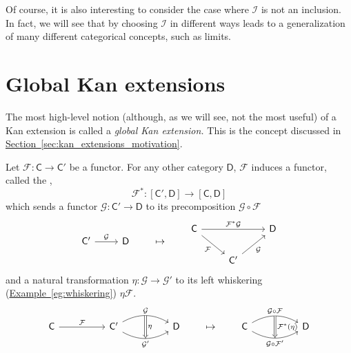 \documentclass[notes.tex]{subfiles}
\begin{document}
Of course, it is also interesting to consider the case where $\mathcal{I}$ is not an inclusion. In fact, we will see that by choosing $\mathcal{I}$ in different ways leads to a generalization of many different categorical concepts, such as limits.

\section{Global Kan extensions}
\label{sec:global_kan_extensions}

The most high-level notion (although, as we will see, not the most useful) of a Kan extension is called a \emph{global Kan extension.} This is the concept discussed in \hyperref[sec:kan_extensions_motivation]{Section~\ref*{sec:kan_extensions_motivation}}.

\begin{definition}[pullback]
  \label{def:pullback}
  Let $\mathcal{F}\colon \mathsf{C} \to \mathsf{C}'$ be a functor. For any other category $\mathsf{D}$, $\mathcal{F}$ induces a functor, called the ,
  \begin{equation*}
    \mathcal{F}^{*}\colon [\mathsf{C}', \mathsf{D}] \to [\mathsf{C}, \mathsf{D}]
  \end{equation*}
  which sends a functor $\mathcal{G}\colon \mathsf{C}' \to \mathsf{D}$ to its precomposition $\mathcal{G} \circ \mathcal{F}$
  \begin{equation*}
    \begin{tikzcd}
      \mathsf{C}'
      \arrow[r, "\mathcal{G}"]
      & \mathsf{D}
    \end{tikzcd}
    \qquad
    \mapsto
    \qquad
    \begin{tikzcd}
      \mathsf{C}
      \arrow[dr, swap, "\mathcal{F}"]
      \arrow[rr, "\mathcal{F}^{*}\mathcal{G}"]
      && \mathsf{D}
      \\
      & \mathsf{C'}
      \arrow[ur, swap, "\mathcal{G}"]
    \end{tikzcd}
  \end{equation*}
  and a natural transformation $\eta\colon \mathcal{G} \to \mathcal{G}'$ to its left whiskering (\hyperref[eg:whiskering]{Example~\ref*{eg:whiskering}}) $\eta\mathcal{F}$.
  \begin{equation*}
    \begin{tikzcd}[column sep=huge]
      \mathsf{C}
      \arrow[r, "\mathcal{F}"]
      &\mathsf{C}'
      \arrow[r, bend left, "\mathcal{G}"{name=U}]
      \arrow[r, bend right, swap, "\mathcal{G}'"{name=D}]
      & \mathsf{D}
      \arrow[from=U, to=D, Rightarrow, "\eta"]
    \end{tikzcd}
    \qquad
    \mapsto
    \qquad
    \begin{tikzcd}[column sep=huge]
      \mathsf{C}
      \arrow[r, bend left, "\mathcal{G} \circ \mathcal{F}"{name=U}]
      \arrow[r, bend right, swap, "\mathcal{G} \circ \mathcal{F}'"{name=D}]
      & \mathsf{D}
      \arrow[from=U, to=D, Rightarrow, "\mathcal{F}^{*}(\eta)"]
    \end{tikzcd}
  \end{equation*}
\end{definition}
\end{document}
